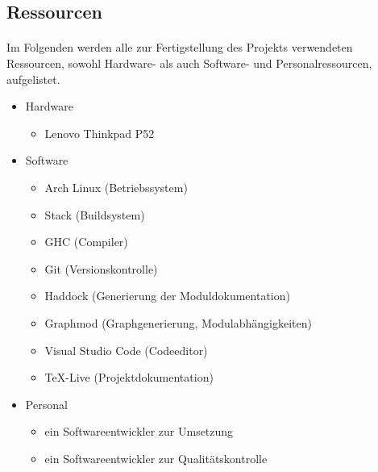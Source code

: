 \subsection{Ressourcen}
\paragraph{}
Im Folgenden werden alle zur Fertigstellung des Projekts verwendeten Ressourcen, sowohl
Hardware- als auch Software- und Personalressourcen, aufgelistet.

\begin{itemize}
    \item Hardware \begin{itemize}
              \item Lenovo Thinkpad P52
          \end{itemize}
    \item Software \begin{itemize}
              \item Arch Linux (Betriebssystem) \cite{arch}
              \item Stack (Buildsystem) \cite{stack}
              \item GHC (Compiler) \cite{ghc}
              \item Git (Versionskontrolle) \cite{git}
              \item Haddock (Generierung der Moduldokumentation) \cite{haddock}
              \item Graphmod (Graphgenerierung, Modulabhängigkeiten) \cite{graphmod}
              \item Visual Studio Code (Codeeditor) \cite{vscode}
              \item \TeX -Live (Projektdokumentation) \cite{texlive}
          \end{itemize}
    \item Personal \begin{itemize}
              \item ein Softwareentwickler zur Umsetzung
              \item ein Softwareentwickler zur Qualitätskontrolle
          \end{itemize}
\end{itemize}
